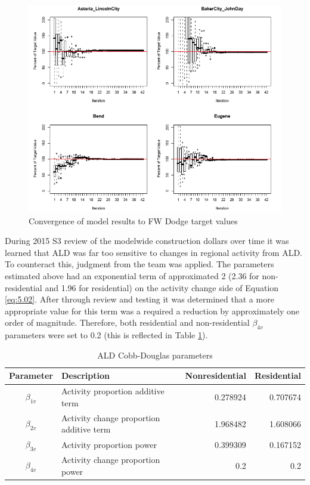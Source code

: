 \begin{figure}[!t]
\centering
\includegraphics[width=6in]{ald/fwdodge-target-convergence}
\caption{Convergence of model results to FW Dodge target values}\label{fig:fwdodge-target-convergence}
\end{figure}

During 2015 S3 review of the modelwide construction dollars over time it was learned that ALD was far too sensitive to changes in regional activity from ALD. To counteract this, judgment from the team was applied. The parameters estimated above had an exponential term of approximated 2 (2.36 for non-residential and 1.96 for residential) on the activity change side of Equation \ref{eq:5.02}. After through review and testing it was determined that a more appropriate value for this term was a required a reduction by approximately one order of magnitude. Therefore, both residential and non-residential $\beta_{4v}$ parameters were set to 0.2 (this is reflected in Table \ref{tab:coff-douglas-parameters}).

\begin{table}   %
\centering
\caption{ALD Cobb-Douglas parameters}\label{tab:coff-douglas-parameters}
\begin{tabular}{clrr}
\hline
Parameter & Description & Nonresidential & Residential \\
\hline
$\beta_{1v}$ & Activity proportion additive term & 0.278924 & 0.707674 \\
$\beta_{2v}$ & Activity change proportion additive term & 1.968482 & 1.608066 \\
$\beta_{3v}$ & Activity proportion power & 0.399309 & 0.167152 \\
$\beta_{4v}$ & Activity change proportion power & 0.2 & 0.2 \\
\hline
\end{tabular}
\end{table}

